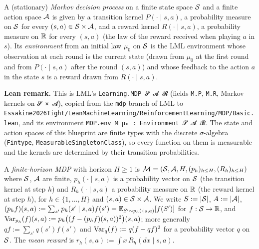 \begin{definition}\label{def:mdp}
\leanok
A (stationary) \emph{Markov decision process} on a finite state space $\mathcal{S}$ and a finite action
space $\mathcal{A}$ is given by a transition kernel $P(\cdot \mid s, a)$, a probability measure on
$\mathcal{S}$ for every $(s, a) \in \mathcal{S} \times \mathcal{A}$, and a reward kernel $R(\cdot \mid s, a)$, a
probability measure on $\mathbb{R}$ for every $(s, a)$ (the law of the reward received when playing $a$
in $s$). Its \emph{environment} from an initial law $\mu_0$ on $\mathcal{S}$ is the LML environment
whose observation at each round is the current state (drawn from $\mu_0$ at the first round
and from $P(\cdot \mid s, a)$ after the round $(s, a)$) and whose feedback to the action $a$ in
the state $s$ is a reward drawn from $R(\cdot \mid s, a)$.
\end{definition}

\textbf{Lean remark.} This is LML's \texttt{Learning.MDP 𝓢 𝓐 𝓡} (fields \texttt{M.P},
\texttt{M.R}, Markov kernels on \texttt{𝓢 × 𝓐}), copied from the \texttt{mdp} branch of LML to
\texttt{Essakine2026Tight/LeanMachineLearning/ReinforcementLearning/MDP/Basic.lean}, and its
environment \texttt{MDP.env M μ₀ : Environment 𝓢 𝓐 𝓡}. The state and action spaces of this
blueprint are finite types with the discrete $\sigma$-algebra (\texttt{Fintype},
\texttt{MeasurableSingletonClass}), so every function on them is measurable and the kernels are
determined by their transition probabilities.

\begin{definition}\label{def:episodic_mdp}
\leanok
{}
A \emph{finite-horizon MDP} with horizon $H \ge 1$ is
$\mathcal M = (\mathcal{S}, \mathcal{A}, H, (p_h)_{h \le H}, (R_h)_{h \le H})$ where $\mathcal{S}$, $\mathcal{A}$ are finite,
$p_h(\cdot \mid s, a)$ is a probability vector on $\mathcal{S}$ (the transition kernel at step $h$) and
$R_h(\cdot \mid s, a)$ a probability measure on $\mathbb{R}$ (the reward kernel at step $h$), for
$h \in \{1, \dots, H\}$ and $(s, a) \in \mathcal{S} \times \mathcal{A}$. We write $S := \lvert \mathcal{S} \rvert$, $A := \lvert \mathcal{A} \rvert$,
$(p_h f)(s, a) := \sum_{s'} p_h(s' \mid s, a) f(s') = \mathbb{E}_{S' \sim p_h(\cdot \mid s, a)}[f(S')]$
for $f : \mathcal{S} \to \mathbb{R}$, and $\operatorname{Var}_{p_h}(f)(s, a) := p_h\big((f - (p_h f)(s, a))^2\big)(s, a)$;
more generally $q f := \sum_{s'} q(s') f(s')$ and $\operatorname{Var}_q(f) := q(f - qf)^2$ for a probability
vector $q$ on $\mathcal{S}$. The \emph{mean reward} is $r_h(s, a) := \int x\, R_h(dx \mid s, a)$.
\end{definition}

